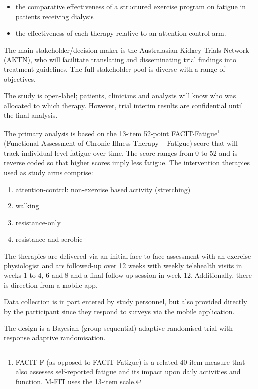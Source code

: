 \documentclass[
]{article}
\providecommand{\tightlist}{%
  \setlength{\itemsep}{0pt}\setlength{\parskip}{0pt}}
\begin{document}
\begin{itemize}\tightlist
  \item the comparative effectiveness of a structured exercise program on fatigue in patients receiving dialysis
  \item the effectiveness of each therapy relative to an attention-control arm.
\end{itemize}

The main stakeholder/decision maker is the Australasian Kidney Trials Network (AKTN), who will facilitate translating and disseminating trial findings into treatment guidelines.
The full stakeholder pool is diverse with a range of objectives.

The study is open-label; patients, clinicians and analysts will know who was allocated to which therapy.
However, trial interim results are confidential until the final analysis.

The primary analysis is based on the 13-item 52-point FACIT-Fatigue\footnote{FACIT-F (as opposed to FACIT-Fatigue) is a related 40-item measure that also assesses self-reported fatigue and its impact upon daily activities and function. M-FIT uses the 13-item scale.} (Functional Assessment of Chronic Illness Therapy – Fatigue) score that will track individual-level fatigue over time.
The score ranges from 0 to 52 and is reverse coded so that \underline{higher scores imply less fatigue}.
The intervention therapies used as study arms comprise:

\begin{enumerate}\tightlist
  \item attention-control: non-exercise based activity (stretching)
  \item walking
  \item resistance-only
  \item resistance and aerobic
\end{enumerate}

The therapies are delivered via an initial face-to-face assessment with an exercise physiologist and are followed-up over 12 weeks with weekly telehealth visits in weeks 1 to 4, 6 and 8 and a final follow up session in week 12.
Additionally, there is direction from a mobile-app.

Data collection is in part entered by study personnel, but also provided directly by the participant since they respond to surveys via the mobile application.

The design is a Bayesian (group sequential) adaptive randomised trial with response adaptive randomisation.
\end{document}
